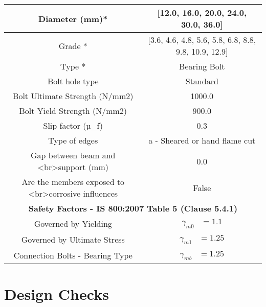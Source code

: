 \documentclass{article}%
\begin{document}
\begin{longtable}{|p{5cm}|p{2cm}|p{2cm}|p{2cm}|p{5cm}|}
\hline%
\hline%
\multicolumn{3}{|c|}{Diameter (mm)*}&\multicolumn{2}{|c|}{{[}12.0, 16.0, 20.0, 24.0, 30.0, 36.0{]}}\\%
\hline%
\hline%
\multicolumn{3}{|c|}{Grade *}&\multicolumn{2}{|c|}{{[}3.6, 4.6, 4.8, 5.6, 5.8, 6.8, 8.8, 9.8, 10.9, 12.9{]}}\\%
\hline%
\hline%
\multicolumn{3}{|c|}{Type *}&\multicolumn{2}{|c|}{Bearing Bolt}\\%
\hline%
\hline%
\multicolumn{3}{|c|}{Bolt hole type}&\multicolumn{2}{|c|}{Standard}\\%
\hline%
\hline%
\multicolumn{3}{|c|}{Bolt Ultimate Strength (N/mm2)}&\multicolumn{2}{|c|}{1000.0}\\%
\hline%
\hline%
\multicolumn{3}{|c|}{Bolt Yield Strength (N/mm2)}&\multicolumn{2}{|c|}{900.0}\\%
\hline%
\hline%
\multicolumn{3}{|c|}{Slip factor (µ\_f)}&\multicolumn{2}{|c|}{0.3}\\%
\hline%
\hline%
\multicolumn{3}{|c|}{Type of edges}&\multicolumn{2}{|c|}{a {-} Sheared or hand flame cut}\\%
\hline%
\hline%
\multicolumn{3}{|c|}{Gap between beam and <br>support (mm)}&\multicolumn{2}{|c|}{0.0}\\%
\hline%
\hline%
\multicolumn{3}{|c|}{Are the members exposed to <br>corrosive influences}&\multicolumn{2}{|c|}{False}\\%
\hline%
\hline%
\multicolumn{5}{|c|}{\textbf{Safety Factors {-} IS 800:2007 Table 5 (Clause 5.4.1) }}\\%
\hline%
\hline%
\multicolumn{3}{|c|}{Governed by Yielding}&\multicolumn{2}{|c|}{$\begin{aligned}\gamma_{m0}&=1.1\end{aligned}$}\\%
\hline%
\hline%
\multicolumn{3}{|c|}{Governed by Ultimate Stress}&\multicolumn{2}{|c|}{$\begin{aligned}\gamma_{m1}&=1.25\end{aligned}$}\\%
\hline%
\hline%
\multicolumn{3}{|c|}{Connection Bolts {-} Bearing Type}&\multicolumn{2}{|c|}{$\begin{aligned}\gamma_{mb}&=1.25\end{aligned}$}\\%
\hline%
\end{longtable}

%
%
\newpage%
\section{Design Checks}%
\label{sec:DesignChecks}%
\end{document}
